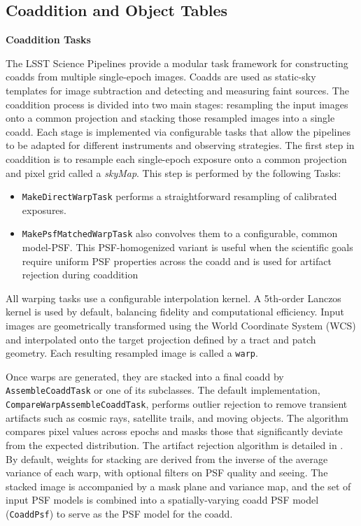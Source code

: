 \subsection{Coaddition and Object Tables}

\textbf{Coaddition Tasks}
\label{sec:coaddition}

The LSST Science Pipelines provide a modular task framework for constructing coadds from multiple single-epoch images.
Coadds are used as static-sky templates for image subtraction and detecting and measuring faint sources.
The coaddition process is divided into two main stages: resampling the input images onto a common projection and stacking those resampled images into a single coadd.
Each stage is implemented via configurable tasks that allow the pipelines to be adapted for different instruments and observing strategies.
The first step in coaddition is to resample each single-epoch exposure onto a common projection and pixel grid called a \textit{skyMap}.
This step is performed by the following Tasks:
\begin{itemize}
\item \texttt{MakeDirectWarpTask} performs a straightforward resampling of calibrated exposures.
 \item \texttt{MakePsfMatchedWarpTask} also convolves them to a configurable, common model-PSF.
 This PSF-homogenized variant is useful when the scientific goals require uniform PSF properties across the coadd and is used for artifact rejection during coaddition
 \end{itemize}

All warping tasks use a configurable interpolation kernel. A 5th-order Lanczos kernel is used by default, balancing fidelity and computational efficiency.
Input images are geometrically transformed using the World Coordinate System (WCS) and interpolated onto the target projection defined by a tract and patch geometry.
Each resulting resampled image is called a \texttt{warp}.

Once warps are generated, they are stacked into a final coadd by \texttt{AssembleCoaddTask} or one of its subclasses.
The default implementation, \texttt{CompareWarpAssembleCoaddTask}, performs outlier rejection to remove transient artifacts such as cosmic rays, satellite trails, and moving objects.
The algorithm compares pixel values across epochs and masks those that significantly deviate from the expected distribution.
The artifact rejection algorithm is detailed in \citet{DMTN-080}.
By default, weights for stacking are derived from the inverse of the average variance of each warp, with optional filters on PSF quality and seeing.
The stacked image is accompanied by a mask plane and variance map, and the set of input PSF models is combined into a spatially-varying coadd PSF model (\texttt{CoaddPsf}) to serve as the PSF model for the coadd.

